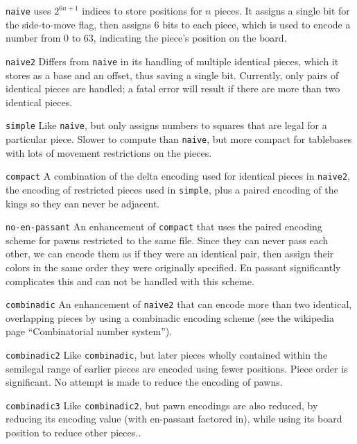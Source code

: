 \documentclass[11pt]{article}
\begin{document}
\begin{description}

\item {\tt naive} uses $2^{6n+1}$ indices to store positions for $n$ pieces.
It assigns a single bit for the side-to-move flag, then assigns 6 bits
to each piece, which is used to encode a number from 0 to 63,
indicating the piece's position on the board.

\item {\tt naive2} Differs from {\tt naive} in its handling of multiple
identical pieces, which it stores as a base and an offset, thus saving
a single bit.  Currently, only pairs of identical pieces are handled;
a fatal error will result if there are more than two identical pieces.

\item {\tt simple} Like {\tt naive}, but only assigns numbers to
squares that are legal for a particular piece.  Slower to compute than
{\tt naive}, but more compact for tablebases with lots of movement
restrictions on the pieces.

\item {\tt compact} A combination of the delta encoding used for
identical pieces in {\tt naive2}, the encoding of restricted pieces used
in {\tt simple}, plus a paired encoding of the kings so they can never be
adjacent.

\item {\tt no-en-passant} An enhancement of {\tt compact} that uses
the paired encoding scheme for pawns restricted to the same file.
Since they can never pass each other, we can encode them as if they
were an identical pair, then assign their colors in the same order
they were originally specified.  En passant significantly complicates
this and can not be handled with this scheme.

\item {\tt combinadic} An enhancement of {\tt naive2} that can encode
  more than two identical, overlapping pieces by using a combinadic
  encoding scheme (see the wikipedia page ``Combinatorial number
  system'').

\item {\tt combinadic2} Like {\tt combinadic}, but later pieces wholly
  contained within the semilegal range of earlier pieces are encoded
  using fewer positions.  Piece order is significant.  No attempt is
  made to reduce the encoding of pawns.

\item {\tt combinadic3} Like {\tt combinadic2}, but pawn encodings are
  also reduced, by reducing its encoding value (with en-passant
  factored in), while using its board position to reduce other pieces..


\end{description}
\end{document}
